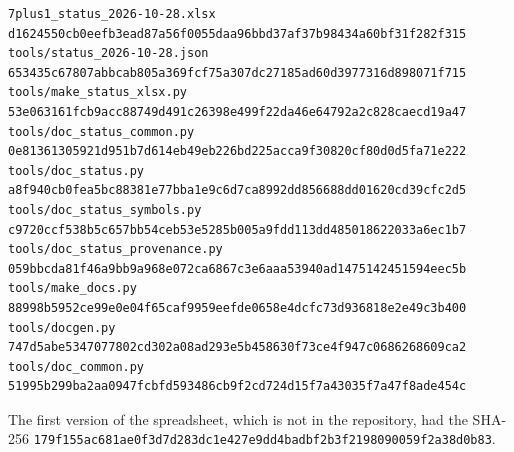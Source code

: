 \documentclass[10pt,a4paper]{article}
\begin{document}
\begin{Verbatim}[fontsize=\small,frame=single,framesep=2mm]
7plus1_status_2026-10-28.xlsx  d1624550cb0eefb3ead87a56f0055daa96bbd37af37b98434a60bf31f282f315
tools/status_2026-10-28.json   653435c67807abbcab805a369fcf75a307dc27185ad60d3977316d898071f715
tools/make_status_xlsx.py      53e063161fcb9acc88749d491c26398e499f22da46e64792a2c828caecd19a47
tools/doc_status_common.py     0e81361305921d951b7d614eb49eb226bd225acca9f30820cf80d0d5fa71e222
tools/doc_status.py            a8f940cb0fea5bc88381e77bba1e9c6d7ca8992dd856688dd01620cd39cfc2d5
tools/doc_status_symbols.py    c9720ccf538b5c657bb54ceb53e5285b005a9fdd113dd485018622033a6ec1b7
tools/doc_status_provenance.py 059bbcda81f46a9bb9a968e072ca6867c3e6aaa53940ad1475142451594eec5b
tools/make_docs.py             88998b5952ce99e0e04f65caf9959eefde0658e4dcfc73d936818e2e49c3b400
tools/docgen.py                747d5abe5347077802cd302a08ad293e5b458630f73ce4f947c0686268609ca2
tools/doc_common.py            51995b299ba2aa0947fcbfd593486cb9f2cd724d15f7a43035f7a47f8ade454c
\end{Verbatim}
The first version of the spreadsheet, which is not in the repository, had the SHA-256 \texttt{179f155a\allowbreak{}c681ae0f\allowbreak{}3d7d283d\allowbreak{}c1e427e9\allowbreak{}dd4badbf\allowbreak{}2b3f2198\allowbreak{}090059f2\allowbreak{}a38d0b83}.
\end{document}

